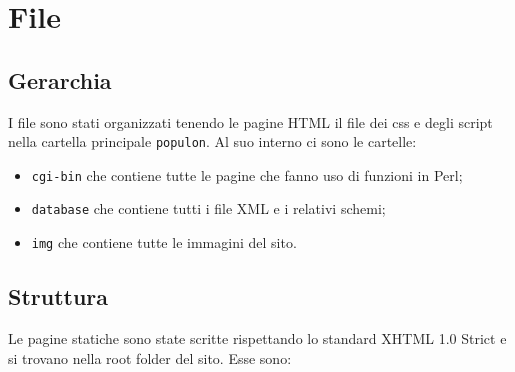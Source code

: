 \documentclass{article}
\begin{document}

\section{File}
\subsection{Gerarchia}
	I file sono stati organizzati tenendo le pagine HTML il file dei css e degli script nella cartella principale 
	\texttt{populon}. Al suo interno ci sono le cartelle: 
		\begin{itemize}
			\item \texttt{cgi-bin} che contiene tutte le pagine che fanno uso di funzioni in Perl;
			\item \texttt{database} che contiene tutti i file XML e i relativi schemi;
			\item \texttt{img} che contiene tutte le immagini del sito.
		\end{itemize}
\subsection{Struttura}

	Le pagine statiche sono state scritte rispettando lo standard XHTML 1.0 Strict e si trovano nella root folder del sito. Esse sono:\\
	
\end{document}
